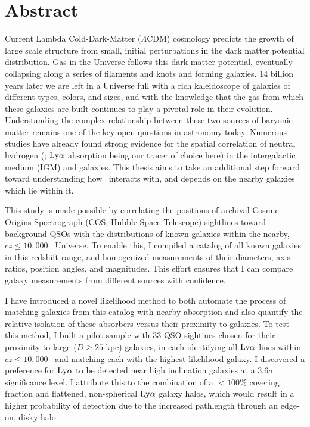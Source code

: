 \chapter*{Abstract}

Current Lambda Cold-Dark-Matter ($\Lambda$CDM) cosmology predicts the growth of large scale structure from small, initial perturbations in the dark matter potential distribution. Gas in the Universe follows this dark matter potential, eventually collapsing along a series of filaments and knots and forming galaxies. 14 billion years later we are left in a Universe full with a rich kaleidoscope of galaxies of different types, colors, and sizes, and with the knowledge that the gas from which these galaxies are built continues to play a pivotal role in their evolution. Understanding the complex relationship between these two sources of baryonic matter remains one of the key open questions in astronomy today. Numerous studies have already found strong evidence for the spatial correlation of neutral hydrogen (\HI; $\rm Ly\alpha$ absorption being our tracer of choice here) in the intergalactic medium (IGM) and galaxies. This thesis aims to take an additional step forward toward understanding how \HI~interacts with, and depends on the nearby galaxies which lie within it. 

This study is made possible by correlating the positions of archival Cosmic Origins Spectrograph (COS; Hubble Space Telescope) sightlines toward background QSOs with the distributions of known galaxies within the nearby, $cz \leq 10,000$ \kms~Universe. To enable this, I compiled a catalog of all known galaxies in this redshift range, and homogenized measurements of their diameters, axis ratios, position angles, and magnitudes. This effort ensures that I can compare galaxy measurements from different sources with confidence. 

I have introduced a novel likelihood method to both automate the process of matching galaxies from this catalog with nearby absorption and also quantify the relative isolation of these absorbers versus their proximity to galaxies. To test this method, I built a pilot sample with 33 QSO sightines chosen for their proximity to large ($D \ge 25$ kpc) galaxies, in each identifying all $\rm Ly\alpha$ lines within $cz \leq 10,000$ \kms~and matching each with the highest-likelihood galaxy. I discovered a preference for $\rm Ly\alpha$ to be detected near high inclination galaxies at a $3.6\sigma$ significance level. I attribute this to the combination of a $< 100\%$ covering fraction and flattened, non-spherical $\rm Ly\alpha$ galaxy halos, which would result in a higher probability of detection due to the increased pathlength through an edge-on, disky halo.

